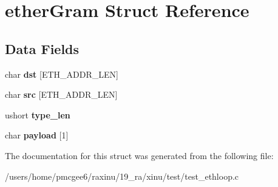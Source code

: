 \hypertarget{structetherGram}{\section{ether\-Gram Struct Reference}
\label{structetherGram}
}
\subsection*{Data Fields}
\begin{DoxyCompactItemize}
\item 
\hypertarget{structetherGram_a07c78e76ca42a80f81d690553c71d44d}{char {\bfseries dst} \mbox{[}E\-T\-H\-\_\-\-A\-D\-D\-R\-\_\-\-L\-E\-N\mbox{]}}\label{structetherGram_a07c78e76ca42a80f81d690553c71d44d}

\item 
\hypertarget{structetherGram_acebc1d055eb534efd908a7983ead7ed8}{char {\bfseries src} \mbox{[}E\-T\-H\-\_\-\-A\-D\-D\-R\-\_\-\-L\-E\-N\mbox{]}}\label{structetherGram_acebc1d055eb534efd908a7983ead7ed8}

\item 
\hypertarget{structetherGram_ab6fd9beed28280c5ecf166df0f12b066}{ushort {\bfseries type\-\_\-len}}\label{structetherGram_ab6fd9beed28280c5ecf166df0f12b066}

\item 
\hypertarget{structetherGram_a6ce1f78074249931f3a2c29813ae8427}{char {\bfseries payload} \mbox{[}1\mbox{]}}\label{structetherGram_a6ce1f78074249931f3a2c29813ae8427}

\end{DoxyCompactItemize}


The documentation for this struct was generated from the following file\-:\begin{DoxyCompactItemize}
\item 
/users/home/pmcgee6/raxinu/19\-\_\-ra/xinu/test/test\-\_\-ethloop.\-c\end{DoxyCompactItemize}
